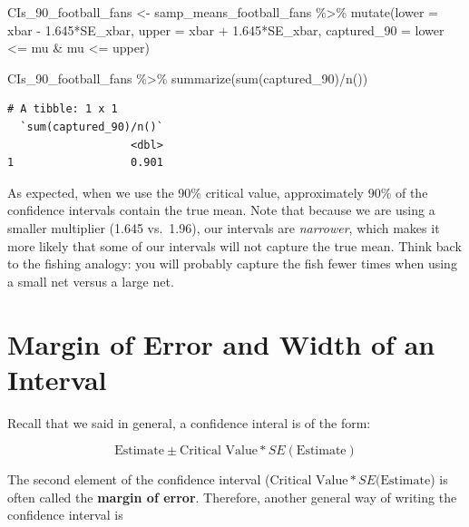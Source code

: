 \documentclass[
  letterpaper,
  DIV=11,
  numbers=noendperiod]{scrreprt}
\newenvironment{Shaded}{\begin{snugshade}}{\end{snugshade}}
\newcommand{\AttributeTok}[1]{\textcolor[rgb]{0.40,0.45,0.13}{#1}}
\newcommand{\FloatTok}[1]{\textcolor[rgb]{0.68,0.00,0.00}{#1}}
\newcommand{\FunctionTok}[1]{\textcolor[rgb]{0.28,0.35,0.67}{#1}}
\newcommand{\NormalTok}[1]{\textcolor[rgb]{0.00,0.23,0.31}{#1}}
\newcommand{\OtherTok}[1]{\textcolor[rgb]{0.00,0.23,0.31}{#1}}
\newcommand{\SpecialCharTok}[1]{\textcolor[rgb]{0.37,0.37,0.37}{#1}}
\theoremstyle{definition}
\theoremstyle{remark}
\begin{document}
\begin{Shaded}
\begin{Highlighting}[]
\NormalTok{CIs\_90\_football\_fans }\OtherTok{\textless{}{-}}\NormalTok{ samp\_means\_football\_fans }\SpecialCharTok{\%\textgreater{}\%} 
  \FunctionTok{mutate}\NormalTok{(}\AttributeTok{lower =}\NormalTok{ xbar }\SpecialCharTok{{-}} \FloatTok{1.645}\SpecialCharTok{*}\NormalTok{SE\_xbar,}
         \AttributeTok{upper =}\NormalTok{ xbar }\SpecialCharTok{+} \FloatTok{1.645}\SpecialCharTok{*}\NormalTok{SE\_xbar,}
         \AttributeTok{captured\_90 =}\NormalTok{ lower }\SpecialCharTok{\textless{}=}\NormalTok{ mu }\SpecialCharTok{\&}\NormalTok{ mu }\SpecialCharTok{\textless{}=}\NormalTok{ upper)}

\NormalTok{CIs\_90\_football\_fans }\SpecialCharTok{\%\textgreater{}\%} 
  \FunctionTok{summarize}\NormalTok{(}\FunctionTok{sum}\NormalTok{(captured\_90)}\SpecialCharTok{/}\FunctionTok{n}\NormalTok{())}
\end{Highlighting}
\end{Shaded}

\begin{verbatim}
# A tibble: 1 x 1
  `sum(captured_90)/n()`
                   <dbl>
1                  0.901
\end{verbatim}

As expected, when we use the 90\% critical value, approximately 90\% of
the confidence intervals contain the true mean. Note that because we are
using a smaller multiplier (1.645 vs.~1.96), our intervals are
\emph{narrower}, which makes it more likely that some of our intervals
will not capture the true mean. Think back to the fishing analogy: you
will probably capture the fish fewer times when using a small net versus
a large net.

\hypertarget{margin-of-error-and-width-of-an-interval}{%
\section{Margin of Error and Width of an
Interval}\label{margin-of-error-and-width-of-an-interval}}

Recall that we said in general, a confidence interal is of the form:

\[\text{Estimate} \pm \text{Critical Value} * SE(\text{Estimate})\]

The second element of the confidence interval
(\(\text{Critical Value} * SE(\text{Estimate}\)) is often called the
\textbf{margin of error}. Therefore, another general way of writing the
confidence interval is
\end{document}
